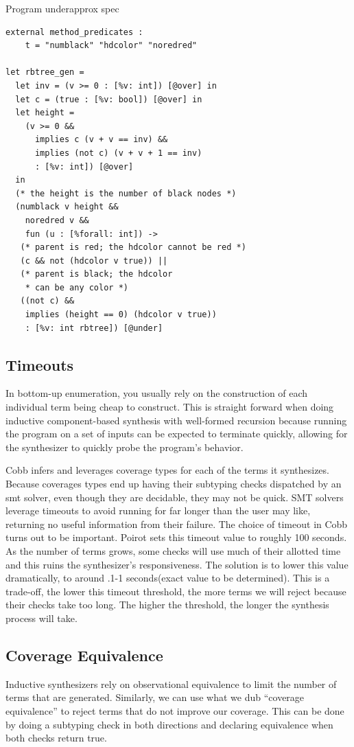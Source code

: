 \documentclass[review, sigplan]{acmart}
\begin{document}
Program underapprox spec
\begin{lstlisting}[language=caml, basicstyle=\small\ttfamily]
external method_predicates :
    t = "numblack" "hdcolor" "noredred"

let rbtree_gen =
  let inv = (v >= 0 : [%v: int]) [@over] in
  let c = (true : [%v: bool]) [@over] in
  let height =
    (v >= 0 &&
      implies c (v + v == inv) &&
      implies (not c) (v + v + 1 == inv)
      : [%v: int]) [@over]
  in
  (* the height is the number of black nodes *)
  (numblack v height &&
    noredred v &&
    fun (u : [%forall: int]) ->
   (* parent is red; the hdcolor cannot be red *)
   (c && not (hdcolor v true)) ||
   (* parent is black; the hdcolor
    * can be any color *)
   ((not c) &&
    implies (height == 0) (hdcolor v true))
    : [%v: int rbtree]) [@under]
\end{lstlisting}

\subsection{Timeouts}

In bottom-up enumeration, you usually rely on the construction of each
individual term being cheap to construct. This is straight forward when doing
inductive component-based synthesis with well-formed recursion because running
the program on a set of inputs can be expected to terminate quickly, allowing
for the synthesizer to quickly probe the program's behavior.

Cobb infers and leverages coverage types for each of the terms it synthesizes.
Because coverages types end up having their subtyping checks dispatched by an
smt solver, even though they are decidable, they may not be quick. SMT solvers
leverage timeouts to avoid running for far longer than the user may like,
returning no useful information from their failure. The choice of timeout in
Cobb turns out to be important. Poirot sets this timeout value to roughly 100
seconds. As the number of terms grows, some checks will use much of their
allotted time and this ruins the synthesizer's responsiveness. The solution is
to lower this value dramatically, to around .1-1 seconds(exact value to be
determined). This is a trade-off, the lower this timeout threshold, the more
terms we will reject because their checks take too long. The higher the
threshold, the longer the synthesis process will take.

\subsection{Coverage Equivalence}
Inductive synthesizers rely on observational equivalence to limit the number of
terms that are generated. Similarly, we can use what we dub ``coverage
equivalence'' to reject terms that do not improve our coverage. This can be done
by doing a subtyping check in both directions and declaring equivalence when
both checks return true.
\end{document}
